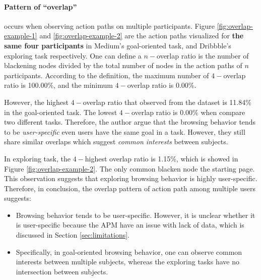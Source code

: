 \paragraph{Pattern of ``overlap''}
occurs when observing action paths on multiple participants. Figure \ref{fig:overlap-example-1}
and \ref{fig:overlap-example-2} are the action paths visualized for \textbf{the same four participants}
in Medium's goal-oriented task, and Dribbble's exploring task respectively.
One can define a $n-$overlap ratio is the number of blackening nodes divided by the total number of nodes
in the action paths of $n$ participants. According to the definition, the maximum number of $4-$overlap ratio
is 100.00\%, and the minimum $4-$overlap ratio is 0.00\%.

However, the highest $4-$overlap ratio that observed from the
dataset is 11.84\% in the goal-oriented task. The lowest $4-$overlap ratio is 0.00\% 
when compare two different tasks.
Therefore, the author argue that the browsing behavior tends to be \emph{user-specific} 
even users have the same goal in a task. However, they still share similar overlaps 
which suggest \emph{common interests} between subjects.

In exploring task, the $4-$highest overlap ratio is 1.15\%, which is showed in Figure \ref{fig:overlap-example-2}.
The only common blacken node the starting page.
This observation suggests that exploring browsing behavior is highly user-specific.
Therefore, in conclusion, the overlap pattern of action path among multiple users suggests:

\begin{itemize}
    \item Browsing behavior tends to be user-specific. 
    However, it is unclear whether it is user-specific 
    because the APM have an issue with lack of data, which is discussed in Section \ref{sec:limitations}.
    \item Specifically, in goal-oriented browsing behavior, 
    one can observe common interests between multiple subjects,
    whereas the exploring tasks have no intersection between subjects.
\end{itemize}

